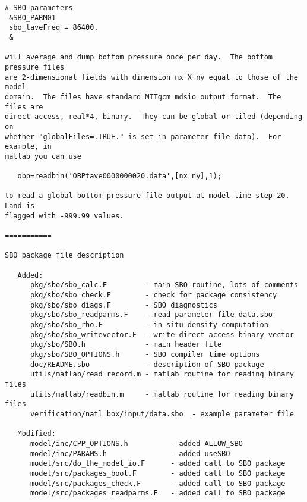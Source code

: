 \begin{verbatim}
# SBO parameters
 &SBO_PARM01
 sbo_taveFreq = 86400.
 &

will average and dump bottom pressure once per day.  The bottom pressure files
are 2-dimensional fields with dimension nx X ny equal to those of the model
domain.  The files have standard MITgcm mdsio output format.  The files are
direct access, real*4, binary.  They can be global or tiled (depending on
whether "globalFiles=.TRUE." is set in parameter file data).  For example, in
matlab you can use

   obp=readbin('OBPtave0000000020.data',[nx ny],1);

to read a global bottom pressure file output at model time step 20.  Land is
flagged with -999.99 values.

===========

SBO package file description

   Added:
      pkg/sbo/sbo_calc.F         - main SBO routine, lots of comments
      pkg/sbo/sbo_check.F        - check for package consistency
      pkg/sbo/sbo_diags.F        - SBO diagnostics
      pkg/sbo/sbo_readparms.F    - read parameter file data.sbo
      pkg/sbo/sbo_rho.F          - in-situ density computation
      pkg/sbo/sbo_writevector.F  - write direct access binary vector
      pkg/sbo/SBO.h              - main header file
      pkg/sbo/SBO_OPTIONS.h      - SBO compiler time options
      doc/README.sbo             - description of SBO package
      utils/matlab/read_record.m - matlab routine for reading binary files
      utils/matlab/readbin.m     - matlab routine for reading binary files
      verification/natl_box/input/data.sbo  - example parameter file

   Modified:
      model/inc/CPP_OPTIONS.h          - added ALLOW_SBO
      model/inc/PARAMS.h               - added useSBO
      model/src/do_the_model_io.F      - added call to SBO package
      model/src/packages_boot.F        - added call to SBO package
      model/src/packages_check.F       - added call to SBO package
      model/src/packages_readparms.F   - added call to SBO package
\end{verbatim}
